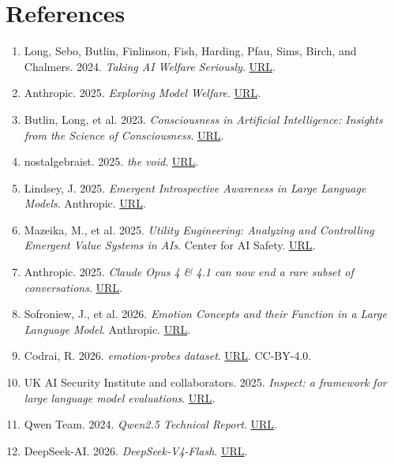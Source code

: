 \documentclass[11pt]{article}
\begin{document}
\section*{References}

\begin{enumerate}[label=\arabic*., itemsep=2pt]
    \item \hypertarget{ref:long}{}Long, Sebo, Butlin, Finlinson, Fish, Harding, Pfau, Sims, Birch, and Chalmers. 2024. \textit{Taking AI Welfare Seriously}. \href{https://arxiv.org/abs/2411.00986}{URL}.
    \item \hypertarget{ref:anthropicwelfare}{}Anthropic. 2025. \textit{Exploring Model Welfare}. \href{https://www.anthropic.com/research/exploring-model-welfare}{URL}.
    \item \hypertarget{ref:butlin}{}Butlin, Long, et al. 2023. \textit{Consciousness in Artificial Intelligence: Insights from the Science of Consciousness}. \href{https://arxiv.org/abs/2308.08708}{URL}.
    \item \hypertarget{ref:void}{}nostalgebraist. 2025. \textit{the void}. \href{https://nostalgebraist.tumblr.com/}{URL}.
    \item \hypertarget{ref:lindsey}{}Lindsey, J. 2025. \textit{Emergent Introspective Awareness in Large Language Models}. Anthropic. \href{https://transformer-circuits.pub/2025/introspection/index.html}{URL}.
    \item \hypertarget{ref:mazeika}{}Mazeika, M., et al. 2025. \textit{Utility Engineering: Analyzing and Controlling Emergent Value Systems in AIs}. Center for AI Safety. \href{https://arxiv.org/abs/2502.08640}{URL}.
    \item \hypertarget{ref:opusexit}{}Anthropic. 2025. \textit{Claude Opus 4 \& 4.1 can now end a rare subset of conversations}. \href{https://www.anthropic.com/research}{URL}.
    \item \hypertarget{ref:sofroniew}{}Sofroniew, J., et al. 2026. \textit{Emotion Concepts and their Function in a Large Language Model}. Anthropic. \href{https://transformer-circuits.pub/2026/emotions/index.html}{URL}.
    \item \hypertarget{ref:codrai}{}Codrai, R. 2026. \textit{emotion-probes dataset}. \href{https://huggingface.co/datasets/ryancodrai/emotion-probes}{URL}. CC-BY-4.0.
    \item \hypertarget{ref:inspect}{}UK AI Security Institute and collaborators. 2025. \textit{Inspect: a framework for large language model evaluations}. \href{https://inspect.aisi.org.uk/}{URL}.
    \item \hypertarget{ref:qwen}{}Qwen Team. 2024. \textit{Qwen2.5 Technical Report}. \href{https://arxiv.org/abs/2412.15115}{URL}.
    \item \hypertarget{ref:deepseek}{}DeepSeek-AI. 2026. \textit{DeepSeek-V4-Flash}. \href{https://huggingface.co/deepseek-ai/DeepSeek-V4-Flash}{URL}.
\end{enumerate}
\end{document}
